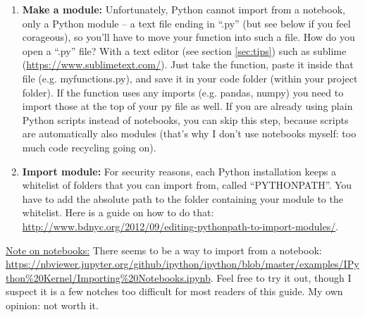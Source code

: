 \documentclass[12pt,a4paper,notitlepage,onecolumn]{article}
\begin{document}
\begin{enumerate}
\item \textbf{Make a module:} Unfortunately, Python cannot import from a notebook, only a Python module -- a text file ending in ``.py'' (but see below if you feel corageous), so you'll have to move your function into such a file. How do you open a ``.py'' file? With a text editor (see section \ref{sec:tips}) such as sublime (\url{https://www.sublimetext.com/}). Just take the function, paste it inside that file (e.g. myfunctions.py), and save it in your code folder (within your project folder). If the function uses any imports (e.g. pandas, numpy) you need to import those at the top of your py file as well. If you are already using plain Python scripts instead of notebooks, you can skip this step, because scripts are automatically also modules (that's why I don't use notebooks myself: too much code recycling going on).
\item \textbf{Import module:} For security reasons, each Python installation keeps a whitelist of folders that you can import from, called ``PYTHONPATH''. You have to add the absolute path to the folder containing your module to the whitelist. Here is a guide on how to do that: \\ \url{http://www.bdnyc.org/2012/09/editing-pythonpath-to-import-modules/}.
\end{enumerate}


\noindent
\underline{Note on notebooks:} There seems to be a way to import from a notebook: \url{https://nbviewer.jupyter.org/github/ipython/ipython/blob/master/examples/IPython\%20Kernel/Importing\%20Notebooks.ipynb}. Feel free to try it out, though I suspect it is a few notches too difficult for most readers of this guide. My own opinion: not worth it.
\end{document}
